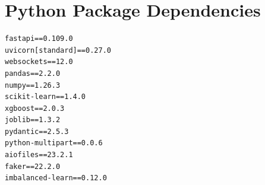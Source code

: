 \documentclass[12pt, a4paper]{report}
\begin{document}
\chapter{Python Package Dependencies}

\begin{lstlisting}[language={}, caption={requirements.txt}]
fastapi==0.109.0
uvicorn[standard]==0.27.0
websockets==12.0
pandas==2.2.0
numpy==1.26.3
scikit-learn==1.4.0
xgboost==2.0.3
joblib==1.3.2
pydantic==2.5.3
python-multipart==0.0.6
aiofiles==23.2.1
faker==22.2.0
imbalanced-learn==0.12.0
\end{lstlisting}
\end{document}
